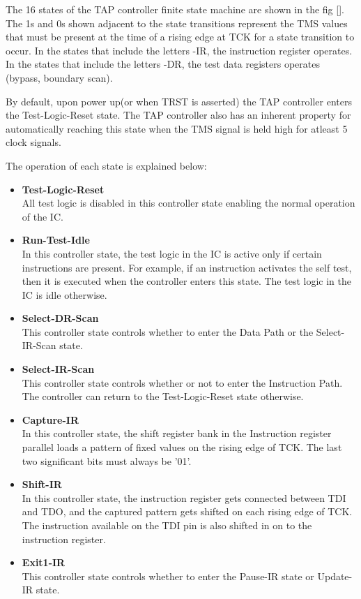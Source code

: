 \documentclass[a4paper,11pt]{article}
\begin{document}
The 16 states of the TAP controller finite state machine are shown in the fig \ref{}. The 1s and 0s shown adjacent to the state transitions represent the TMS values that must be present at the time of a rising edge at TCK for a state transition to occur. In the states that include the letters -IR, the instruction register operates. In the states that include the letters -DR, the test data registers operates (bypass, boundary scan).

By default, upon power up(or when TRST is asserted) the TAP controller enters the Test-Logic-Reset state. The TAP controller also has an inherent property for automatically reaching this state when the TMS signal is held high for atleast 5 clock signals.

The operation of each state is explained below:
\begin{itemize}[noitemsep]
\item \textbf{Test-Logic-Reset} \\All test logic is disabled in this controller state enabling the normal operation of the IC.
\item \textbf{Run-Test-Idle} \\In this controller state, the test logic in the IC is active only if certain instructions are present. For example, if an instruction activates the self test, then it is executed when the controller enters this state. The test logic in the IC is idle otherwise.
\item \textbf{Select-DR-Scan} \\This controller state controls whether to enter the Data Path or the Select-IR-Scan state.
\item \textbf{Select-IR-Scan} \\This controller state controls whether or not to enter the Instruction Path. The controller can return to the Test-Logic-Reset state otherwise.
\item \textbf{Capture-IR} \\In this controller state, the shift register bank in the Instruction register parallel loads a pattern of fixed values on the rising edge of TCK. The last two significant bits must always be '01'.
\item \textbf{Shift-IR} \\In this controller state, the instruction register gets connected between TDI and TDO, and the captured pattern gets shifted on each rising edge of TCK. The instruction available on the TDI pin is also shifted in on to the instruction register.
\item \textbf{Exit1-IR} \\This controller state controls whether to enter the Pause-IR state or Update-IR state.

\end{itemize}
\end{document}
